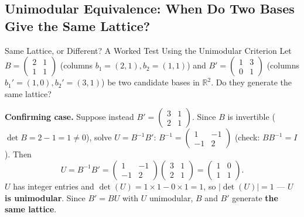 \subsection{Unimodular Equivalence: When Do Two Bases Give the Same Lattice?}
\label{sec:L1:unimodular-equivalence-when-do-two-bases}

\begin{exbox}{Same Lattice, or Different? A Worked Test Using the Unimodular Criterion}
Let $B = \begin{pmatrix} 2 & 1 \\ 1 & 1 \end{pmatrix}$ (columns $b_1=(2,1), b_2=(1,1)$) and $B' = \begin{pmatrix} 1 & 3 \\ 0 & 1 \end{pmatrix}$ (columns $b_1'=(1,0), b_2'=(3,1)$) be two candidate bases in $\mathbb{R}^2$. Do they generate the same lattice?

\textbf{Confirming case.} Suppose instead $B' = \begin{pmatrix} 3 & 1 \\ 2 & 1 \end{pmatrix}$. Since $B$ is invertible ($\det B = 2-1=1 \ne 0$), solve $U = B^{-1}B'$: $B^{-1} = \begin{pmatrix} 1 & -1 \\ -1 & 2\end{pmatrix}$ (check: $B B^{-1}=I$). Then
$$
U = B^{-1}B' = \begin{pmatrix} 1 & -1 \\ -1 & 2\end{pmatrix}\begin{pmatrix} 3 & 1 \\ 2 & 1\end{pmatrix} = \begin{pmatrix} 1 & 0 \\ 1 & 1 \end{pmatrix}.
$$
$U$ has integer entries and $\det(U) = 1\times1 - 0\times1 = 1$, so $|\det(U)|=1$ --- $U$ \textbf{is unimodular}. Since $B' = BU$ with $U$ unimodular, $B$ and $B'$ generate \textbf{the same lattice}.


\end{exbox}
